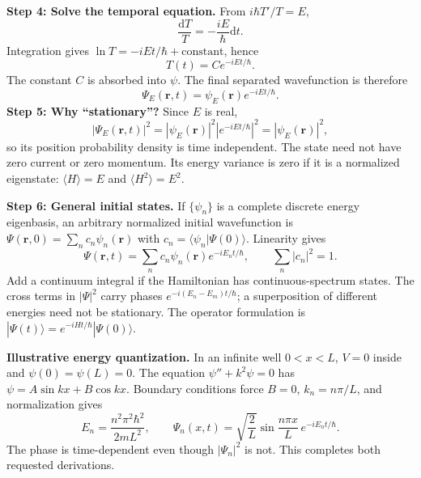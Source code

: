 \documentclass[11pt,a4paper]{article}
\newcommand{\dd}{\mathrm{d}}
\begin{document}
\textbf{Step 4: Solve the temporal equation.} From $i\hbar T'/T=E$,
\begin{equation}
\frac{\dd T}{T}=-\frac{iE}{\hbar}\dd t.
\end{equation}
Integration gives $\ln T=-iEt/\hbar+\text{constant}$, hence
\begin{equation}
\boxed{T(t)=C e^{-iEt/\hbar}}.
\end{equation}
The constant $C$ is absorbed into $\psi$. The final separated wavefunction is therefore
\begin{equation}\label{eq:stationary}
\boxed{\Psi_E(\mathbf r,t)=\psi_E(\mathbf r)e^{-iEt/\hbar}}.
\end{equation}
\textbf{Step 5: Why ``stationary''?} Since $E$ is real,
\begin{equation}
|\Psi_E(\mathbf r,t)|^2=|\psi_E(\mathbf r)|^2|e^{-iEt/\hbar}|^2=|\psi_E(\mathbf r)|^2,
\end{equation}
so its position probability density is time independent. The state need not have zero current or zero momentum. Its energy variance is zero if it is a normalized eigenstate: $\langle H\rangle=E$ and $\langle H^2\rangle=E^2$.
\par\textbf{Step 6: General initial states.} If $\{\psi_n\}$ is a complete discrete energy eigenbasis, an arbitrary normalized initial wavefunction is $\Psi(\mathbf r,0)=\sum_n c_n\psi_n(\mathbf r)$ with $c_n=\langle\psi_n|\Psi(0)\rangle$. Linearity gives
\begin{equation}\label{eq:generalt}
\boxed{\Psi(\mathbf r,t)=\sum_n c_n\psi_n(\mathbf r)e^{-iE_nt/\hbar}},\qquad \sum_n|c_n|^2=1.
\end{equation}
Add a continuum integral if the Hamiltonian has continuous-spectrum states. The cross terms in $|\Psi|^2$ carry phases $e^{-i(E_n-E_m)t/\hbar}$; a superposition of different energies need not be stationary. The operator formulation is $|\Psi(t)\rangle=e^{-iHt/\hbar}|\Psi(0)\rangle$.
\par\textbf{Illustrative energy quantization.} In an infinite well $0<x<L$, $V=0$ inside and $\psi(0)=\psi(L)=0$. The equation $\psi''+k^2\psi=0$ has $\psi=A\sin kx+B\cos kx$. Boundary conditions force $B=0$, $k_n=n\pi/L$, and normalization gives
\begin{equation}
\boxed{E_n=\frac{n^2\pi^2\hbar^2}{2mL^2}},\qquad
\boxed{\Psi_n(x,t)=\sqrt{\frac2L}\sin\frac{n\pi x}{L}\,e^{-iE_nt/\hbar}}.
\end{equation}
The phase is time-dependent even though $|\Psi_n|^2$ is not. This completes both requested derivations.
\end{document}
